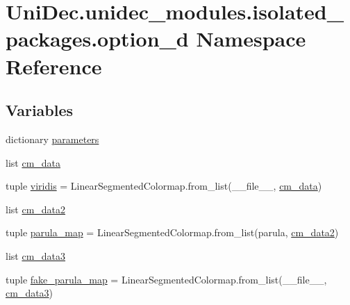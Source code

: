 \hypertarget{namespace_uni_dec_1_1unidec__modules_1_1isolated__packages_1_1option__d}{}\section{Uni\+Dec.\+unidec\+\_\+modules.\+isolated\+\_\+packages.\+option\+\_\+d Namespace Reference}
\label{namespace_uni_dec_1_1unidec__modules_1_1isolated__packages_1_1option__d}
\subsection*{Variables}
\begin{DoxyCompactItemize}
\item 
dictionary \hyperlink{namespace_uni_dec_1_1unidec__modules_1_1isolated__packages_1_1option__d_a734500ea3e09747746659f32150b19ea}{parameters}
\item 
list \hyperlink{namespace_uni_dec_1_1unidec__modules_1_1isolated__packages_1_1option__d_a66d3938f40b892d4ea6874f9b2581714}{cm\+\_\+data}
\item 
tuple \hyperlink{namespace_uni_dec_1_1unidec__modules_1_1isolated__packages_1_1option__d_a5690716cac2b77c4f29d94f62a4a4ac6}{viridis} = Linear\+Segmented\+Colormap.\+from\+\_\+list(\+\_\+\+\_\+file\+\_\+\+\_\+, \hyperlink{namespace_uni_dec_1_1unidec__modules_1_1isolated__packages_1_1option__d_a66d3938f40b892d4ea6874f9b2581714}{cm\+\_\+data})
\item 
list \hyperlink{namespace_uni_dec_1_1unidec__modules_1_1isolated__packages_1_1option__d_aba99b4781050b6057de92c334dc5457f}{cm\+\_\+data2}
\item 
tuple \hyperlink{namespace_uni_dec_1_1unidec__modules_1_1isolated__packages_1_1option__d_a18ad24df6407f120d54a338882c6f1a6}{parula\+\_\+map} = Linear\+Segmented\+Colormap.\+from\+\_\+list(\textquotesingle{}parula\textquotesingle{}, \hyperlink{namespace_uni_dec_1_1unidec__modules_1_1isolated__packages_1_1option__d_aba99b4781050b6057de92c334dc5457f}{cm\+\_\+data2})
\item 
list \hyperlink{namespace_uni_dec_1_1unidec__modules_1_1isolated__packages_1_1option__d_a20a3726663c15e11ecfa30fbbc89bcaa}{cm\+\_\+data3}
\item 
tuple \hyperlink{namespace_uni_dec_1_1unidec__modules_1_1isolated__packages_1_1option__d_a583e0b5fa31f2f9ad45ffa2eb081773c}{fake\+\_\+parula\+\_\+map} = Linear\+Segmented\+Colormap.\+from\+\_\+list(\+\_\+\+\_\+file\+\_\+\+\_\+, \hyperlink{namespace_uni_dec_1_1unidec__modules_1_1isolated__packages_1_1option__d_a20a3726663c15e11ecfa30fbbc89bcaa}{cm\+\_\+data3})
\end{DoxyCompactItemize}


